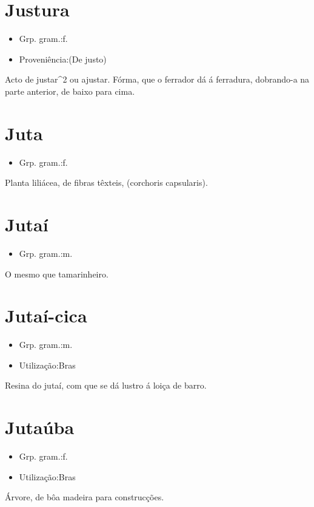 \documentclass{article}
\begin{document}
\section{Justura}
\begin{itemize}
\item {Grp. gram.:f.}
\end{itemize}
\begin{itemize}
\item {Proveniência:(De \textunderscore justo\textunderscore )}
\end{itemize}
Acto de justar^2 ou ajustar.
Fórma, que o ferrador dá á ferradura, dobrando-a na parte anterior, de baixo para cima.
\section{Juta}
\begin{itemize}
\item {Grp. gram.:f.}
\end{itemize}
Planta liliácea, de fibras têxteis, (\textunderscore corchoris capsularis\textunderscore ).
\section{Jutaí}
\begin{itemize}
\item {Grp. gram.:m.}
\end{itemize}
O mesmo que \textunderscore tamarinheiro\textunderscore .
\section{Jutaí-cica}
\begin{itemize}
\item {Grp. gram.:m.}
\end{itemize}
\begin{itemize}
\item {Utilização:Bras}
\end{itemize}
Resina do jutaí, com que se dá lustro á loiça de barro.
\section{Jutaúba}
\begin{itemize}
\item {Grp. gram.:f.}
\end{itemize}
\begin{itemize}
\item {Utilização:Bras}
\end{itemize}
Árvore, de bôa madeira para construcções.
\end{document}
